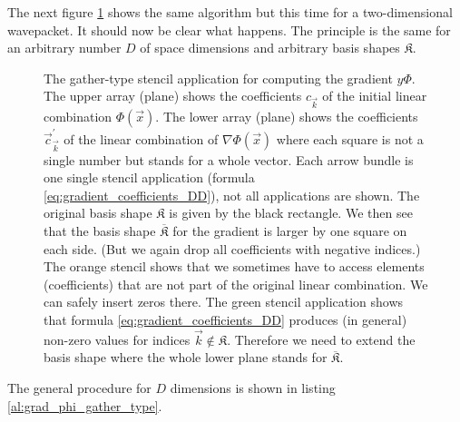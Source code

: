 The next figure \ref{fig:grad_phi_kl_gather_stencil_2D} shows the same
algorithm but this time for a two-dimensional wavepacket. It should now be
clear what happens. The principle is the same for an arbitrary number
$D$ of space dimensions and arbitrary basis shapes $\mathfrak{K}$.

\begin{figure}
  \centering
  
  \caption[Gather-type stencil in 2D] {The gather-type stencil application for
           computing the gradient $y\Phi$. The upper array (plane) shows the
           coefficients $c_{\vec{k}}$ of the initial linear combination $\Phi(\vec{x})$.
           The lower array (plane) shows the coefficients $\vec{c}^\prime_{\vec{k}}$ of the
           linear combination of $\nabla\Phi(\vec{x})$ where each square is not a single
           number but stands for a whole vector. Each arrow bundle is one single
           stencil application (formula \eqref{eq:gradient_coefficients_DD}), not all
           applications are shown.
           The original basis shape $\mathfrak{K}$ is given by the black rectangle.
           We then see that the basis shape $\overline{\mathfrak{K}}$ for the gradient
           is larger by one square on each side. (But we again drop all coefficients
           with negative indices.)
           The orange stencil shows that we sometimes have to access elements (coefficients)
           that are not part of the original linear combination. We can safely insert
           zeros there. The green stencil application shows that formula
           \eqref{eq:gradient_coefficients_DD} produces (in general) non-zero values
           for indices $\vec{k} \notin \mathfrak{K}$. Therefore we need to extend
           the basis shape where the whole lower plane stands for $\overline{\mathfrak{K}}$.
  }
  \label{fig:grad_phi_kl_gather_stencil_2D}
\end{figure}

The general procedure for $D$ dimensions is shown in listing \eqref{al:grad_phi_gather_type}.

